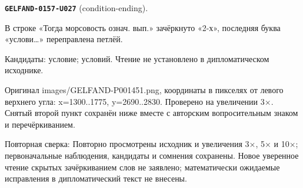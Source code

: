 \par\noindent\leavevmode{}\label{GELFAND-0157-U027}\label{GELFAND-P001451:condition-ending}\textbf{\texttt{GELFAND-0157-U027}} (condition-ending).\nopagebreak[4]\par
В строке «Тогда морсовость означ. вып.» зачёркнуто «2-х», последняя буква «услови…» переправлена петлёй.\par
Кандидаты: условие; условий. Чтение не установлено в дипломатическом исходнике.\par
Оригинал images/GELFAND-P001451.png, координаты в пикселях от левого верхнего угла: x=1300..1775, y=2690..2830. Проверено на увеличении 3×. Снятый второй пункт сохранён ниже вместе с авторским вопросительным знаком и перечёркиванием.\par
Повторная сверка: Повторно просмотрены исходник и увеличения 3×, 5× и 10×; первоначальные наблюдения, кандидаты и сомнения сохранены. Новое уверенное чтение скрытых зачёркиванием слов не заявлено; математически ожидаемые исправления в дипломатический текст не внесены.\par\medskip
